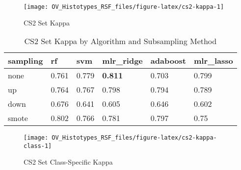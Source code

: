 \documentclass[
]{report}
\begin{document}
\begin{figure}[H]

{\centering \texttt{[image: OV\_Histotypes\_RSF\_files/figure-latex/cs2-kappa-1]} 

}

\caption{CS2 Set Kappa}\label{fig:cs2-kappa}
\end{figure}

\begin{table}

\caption{\label{tab:cs2-kappa-table}CS2 Set Kappa by Algorithm and Subsampling Method}
\centering
\begin{tabular}[t]{l|l|l|l|l|l}
\hline
sampling & rf & svm & mlr\_ridge & adaboost & mlr\_lasso\\
\hline
none & 0.761 & 0.779 & \textbf{0.811} & 0.703 & 0.799\\
\hline
up & 0.764 & 0.767 & 0.798 & 0.794 & 0.789\\
\hline
down & 0.676 & 0.641 & 0.605 & 0.646 & 0.602\\
\hline
smote & 0.802 & 0.766 & 0.781 & 0.797 & 0.75\\
\hline
\end{tabular}
\end{table}

\begin{figure}[H]

{\centering \texttt{[image: OV\_Histotypes\_RSF\_files/figure-latex/cs2-kappa-class-1]} 

}

\caption{CS2 Set Class-Specific Kappa}\label{fig:cs2-kappa-class}
\end{figure}
\end{document}

